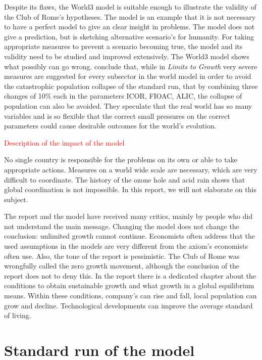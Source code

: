 \documentclass[10pt,a4paper]{scrartcl}
\begin{document}
Despite its flaws, the World3 model is suitable enough to illustrate the validity of the Club of Rome's hypotheses. The model is an example that it is not necessary to have a perfect model to give an clear insight in problems. The model does not give a prediction, but is sketching alternative scenario's for humanity. For taking appropriate measures to prevent a scenario becoming true, the model and its validity need to be studied and improved extensively. The World3 model shows what possibly can go wrong. \cite{vermeulen1976parameter} conclude that, while in \emph{Limits to Growth} very severe measures are suggested for every subsector in the world model in order to avoid the catastrophic population collapse of the standard run, that by combining three changes of 10\% each in the parameters ICOR, FIOAC, ALIC, the collapse of population can also be avoided. They speculate that the real world has so many variables and is so flexible that the correct small pressures on the correct parameters could cause desirable outcomes for the world's evolution.

\textcolor{red}{Description of the impact of the model}

No single country is responsible for the problems on its own or able to take appropriate actions. Measures on a world wide scale are necessary, which are very difficult to coordinate. The history of the ozone hole and acid rain shows that global coordination is not impossible. In this report, we will not elaborate on this subject.

The report and the model have received many critics, mainly by people who did not understand the main message. Changing the model does not change the conclusion: unlimited growth cannot continue. Economists often address that the used assumptions in the models are very different from the axiom's economists often use. Also, the tone of the report is pessimistic. The Club of Rome was wrongfully called the zero growth movement, although the conclusion of the report does not to deny this. In the report there is a dedicated chapter about the conditions to obtain sustainable growth and what growth in a global equilibrium means. Within these conditions, company's can rise and fall, local population can grow and decline. Technological developments can improve the average standard of living.

\section*{Standard run of the model}
\end{document}

